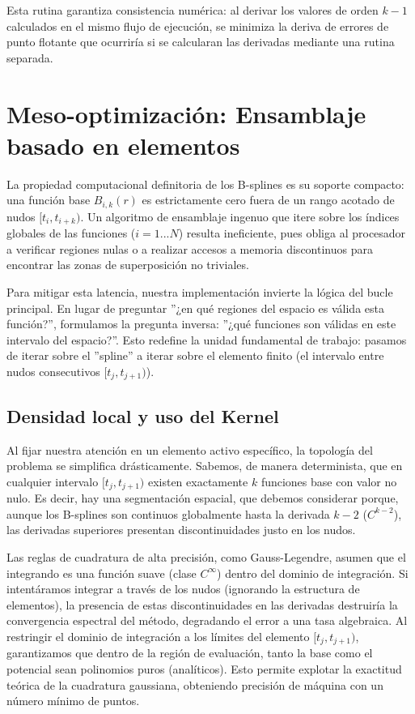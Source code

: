 \documentclass[12pt, a4paper, oneside, spanish]{article}
\begin{document}
Esta rutina garantiza consistencia numérica: al derivar los valores de orden \( k-1 \) calculados en el mismo flujo de ejecución, se minimiza la deriva de errores de punto flotante que ocurriría si se calcularan las derivadas mediante una rutina separada.

\section{Meso-optimización: Ensamblaje basado en elementos}

La propiedad computacional definitoria de los B-splines es su soporte compacto: una función base \( B_{i,k}(r) \) es estrictamente cero fuera de un rango acotado de nudos \( [t_i,t_{i+k}) \). Un algoritmo de ensamblaje ingenuo que itere sobre los índices globales de las funciones (\( i = 1...N \)) resulta ineficiente, pues obliga al procesador a verificar regiones nulas o a realizar accesos a memoria discontinuos para encontrar las zonas de superposición no triviales.

Para mitigar esta latencia, nuestra implementación invierte la lógica del bucle principal. En lugar de preguntar ”¿en qué regiones del espacio es válida esta función?”, formulamos la pregunta inversa: ”¿qué funciones son válidas en este intervalo del espacio?”. Esto redefine la unidad fundamental de trabajo: pasamos de iterar sobre el ”spline” a iterar sobre el elemento finito (el intervalo entre nudos consecutivos \( [t_j, t_{j+1}) \)).

\subsection{Densidad local y uso del Kernel}

Al fijar nuestra atención en un elemento activo específico, la topología del problema se simplifica drásticamente. Sabemos, de manera determinista, que en cualquier intervalo \( [t_j, t_{j+1}) \) existen exactamente \( k \) funciones base con valor no nulo. Es decir, hay una segmentación espacial, que debemos considerar porque, aunque los B-splines son continuos globalmente hasta la derivada \( k-2 \) (\( C^{k-2} \)), las derivadas superiores presentan discontinuidades justo en los nudos.

Las reglas de cuadratura de alta precisión, como Gauss-Legendre, asumen que el integrando es una función suave (clase \( C^{\infty} \)) dentro del dominio de integración. Si intentáramos integrar a través de los nudos (ignorando la estructura de elementos), la presencia de estas discontinuidades en las derivadas destruiría la convergencia espectral del método, degradando el error a una tasa algebraica. Al restringir el dominio de integración a los límites del elemento \( [t_j,t_{j+1}) \), garantizamos que dentro de la región de evaluación, tanto la base como el potencial sean polinomios puros (analíticos). Esto permite explotar la exactitud teórica de la cuadratura gaussiana, obteniendo precisión de máquina con un número mínimo de puntos.
\end{document}
